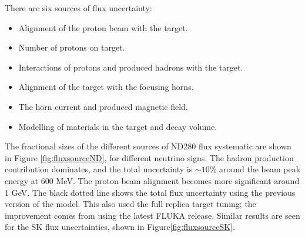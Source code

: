 There are six sources of flux uncertainty:

\begin{itemize}

\item Alignment of the proton beam with the target.

\item Number of protons on target.

\item Interactions of protons and produced hadrons with the target.

\item Alignment of the target with the focusing horns.

\item The horn current and produced magnetic field.

\item Modelling of materials in the target and decay volume.

\end{itemize}

The fractional sizes of the different sources of ND280 flux systematic are shown in Figure \ref{fig:fluxsourceND}, for different neutrino signs. The hadron production contribution dominates, and the total uncertainty is $\sim10\%$ around the beam peak energy at 600 MeV. The proton beam alignment becomes more significant around 1 GeV. The black dotted line shows the total flux uncertainty using the previous version of the model. This also used the full replica target tuning; the improvement comes from using the latest FLUKA\cite{fluka} release. Similar results are seen for the SK flux uncertainties, shown in Figure\ref{fig:fluxsourceSK}.

